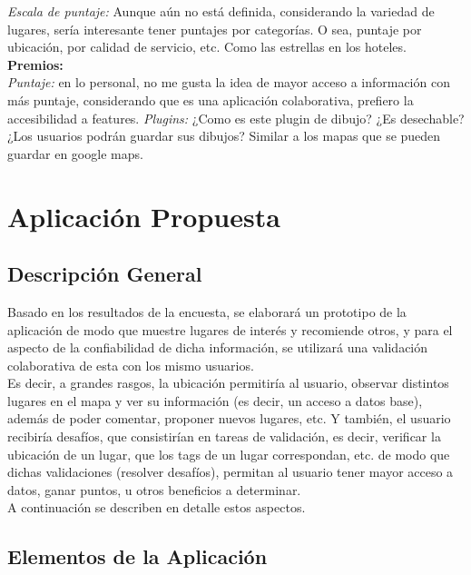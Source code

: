 \documentclass[10pt,letterpaper]{article}
\begin{document}
\textsl{Escala de puntaje:} Aunque aún no está definida, considerando la variedad de lugares, sería interesante tener puntajes por categorías. O sea, puntaje por ubicación, por calidad de servicio, etc. Como las estrellas en los hoteles.\\

\textbf{Premios:}\\

\textsl{Puntaje:} en lo personal, no me gusta la idea de mayor acceso a información con más puntaje, considerando que es una aplicación colaborativa, prefiero la accesibilidad a features.
\textsl{Plugins:} ¿Como es este plugin de dibujo? ¿Es desechable? ¿Los usuarios podrán guardar sus dibujos? Similar a los mapas que se pueden guardar en google maps.

\newpage
\section{Aplicación Propuesta}

\subsection{Descripción General}

Basado en los resultados de la encuesta, se elaborará un prototipo de la aplicación de modo que muestre lugares de interés y recomiende otros, y para el aspecto de la confiabilidad de dicha información, se utilizará una validación colaborativa de esta con los mismo usuarios.\\

Es decir, a grandes rasgos, la ubicación permitiría al usuario, observar distintos lugares en el mapa y ver su información (es decir, un acceso a datos base), además de poder comentar, proponer nuevos lugares, etc. 
Y también, el usuario recibiría desafíos, que consistirían en tareas de validación, es decir, verificar la ubicación de un lugar, que los tags de un lugar correspondan, etc. de modo que dichas validaciones (resolver desafíos), permitan al usuario tener mayor acceso a datos, ganar puntos, u otros beneficios a determinar.\\

A continuación se describen en detalle estos aspectos.\\

\subsection{Elementos de la Aplicación}
\end{document}
